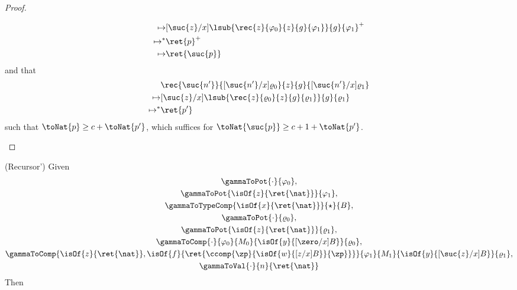 \begin{proof}
\begin{itemize}
\begin{align*}
        \mapsto& [\suc{z}/x]\lsub{\rec{z}{\varphi_0}{z}{g}{\varphi_1}}{g}{\varphi_1}^+\\
        \mapsto^*& \ret{p}^+\\
        \mapsto& \ret{\suc{p}}
    \end{align*} and that 
    \begin{align*}
        &\rec{\suc{n'}}{[\suc{n'}/x]\varrho_0}{z}{g}{[\suc{n'}/x]\varrho_1}\\
        \mapsto &[\suc{z}/x]\lsub{\rec{z}{\varrho_0}{z}{g}{\varrho_1}}{g}{\varrho_1}\\
        \mapsto^* & \ret{p'}
    \end{align*}
    such that $\toNat{p} \ge c + \toNat{p'}$, which suffices for 
    $\toNat{\suc{p}} \ge c+1 + \toNat{p'}$.
\end{itemize}
\end{proof}

\newpage
\begin{lemma}\textnormal{(Recursor')}\label{lemma:recursor'}
Given 
\begin{gather}
\gammaToPot{\cdot}{\varphi_0},\\
\gammaToPot{\isOf{z}{\ret{\nat}}}{\varphi_1},\\
\gammaToTypeComp{\isOf{x}{\ret{\nat}}}{\star}{B},\\
\gammaToPot{\cdot}{\varrho_0},\\
\gammaToPot{\isOf{z}{\ret{\nat}}}{\varrho_1},\\
\gammaToComp{\cdot}{\varphi_0}{M_0}{\isOf{y}{[\zero/x]B}}{\varrho_0},\\
\gammaToComp{\isOf{z}{\ret{\nat}},\isOf{f}{\ret{\ccomp{\zp}{\isOf{w}{[z/x]B}}{\zp}}}}{\varphi_1}
{M_1}{\isOf{y}{[\suc{z}/x]B}}{\varrho_1},\\
\gammaToVal{\cdot}{n}{\ret{\nat}}
\end{gather}
Then 
\end{lemma}

